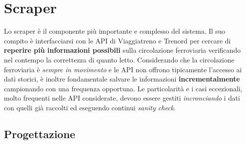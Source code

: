 \documentclass[12pt,a4paper,italian]{report}
\begin{document}
\section{Scraper}
\label{scraper}

Lo scraper è il componente più importante e complesso del sistema.  Il
suo compito è interfacciarsi con le API di Viaggiatreno e Trenord per
cercare di \textbf{reperire più informazioni possibili} sulla
circolazione ferroviaria verificando nel contempo la correttezza di
quanto letto.  Considerando che la circolazione ferroviaria è
\textit{sempre in movimento} e le API non offrono tipicamente
l'accesso ai dati storici, è inoltre fondamentale salvare le
informazioni \textbf{incrementalmente} campionando con una frequenza
opportuna.
Le particolarità e i casi eccezionali, molto frequenti nelle API
considerate, devono essere gestiti \textit{incronciando} i dati con
quelli già raccolti ed eseguendo continui \textit{sanity check}.

\subsection{Progettazione}
\end{document}
